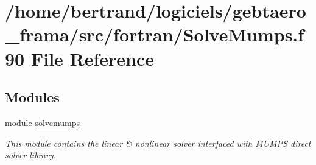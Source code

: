 \hypertarget{_solve_mumps_8f90}{}\section{/home/bertrand/logiciels/gebtaero\+\_\+frama/src/fortran/\+Solve\+Mumps.f90 File Reference}
\label{_solve_mumps_8f90}
\subsection*{Modules}
\begin{DoxyCompactItemize}
\item 
module \hyperlink{namespacesolvemumps}{solvemumps}
\begin{DoxyCompactList}\small\item\em This module contains the linear \& nonlinear solver interfaced with M\+U\+M\+PS direct solver library. \end{DoxyCompactList}\end{DoxyCompactItemize}
